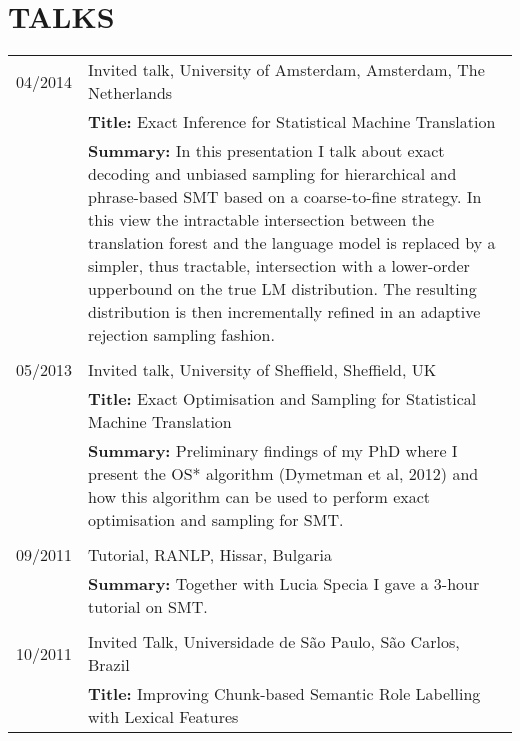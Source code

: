 
\section*{TALKS}

\begin{tabular}{p{2cm}  p{13.92cm}}
04/2014 & Invited talk, University of Amsterdam, Amsterdam, The Netherlands \\
        & {\bf Title:} Exact Inference for Statistical Machine Translation \\
        & {\bf Summary:} In this presentation I talk about exact decoding and unbiased sampling for hierarchical and phrase-based SMT based on a coarse-to-fine strategy. In this view the intractable intersection between the translation forest and the language model is replaced by a simpler, thus tractable, intersection with a lower-order upperbound on the true LM distribution. The resulting distribution is then incrementally refined in an adaptive rejection sampling fashion.  \\
        & \\
05/2013 & Invited talk, University of Sheffield, Sheffield, UK \\
        & {\bf Title:} Exact Optimisation and Sampling for Statistical Machine Translation \\
        & {\bf Summary:} Preliminary findings of my PhD where I present the OS* algorithm (Dymetman et al, 2012) and how this algorithm can be used to perform exact optimisation and sampling for SMT. \\
        & \\
09/2011	& Tutorial, RANLP, Hissar, Bulgaria \\
	& {\bf Summary:} Together with Lucia Specia I gave a 3-hour tutorial on SMT. \\
	& \\
10/2011	& Invited Talk, Universidade de S\~ao Paulo, S\~ao Carlos, Brazil \\
	& {\bf Title:} Improving Chunk-based Semantic Role Labelling with Lexical Features \\

\end{tabular}
